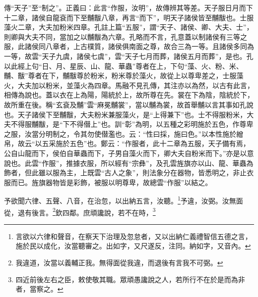 {\noindent\zhuan{}\fzbyks 傳“天子”至“制之”。正義曰：此言“作服，汝明”，故傳辨其等差。天子服日月而下十二章，諸侯自龍袞而下至黼黻八章，再言“而下”，明天子諸侯皆至黼黻也。士服藻火二章，大夫加粉米四章。孔註上篇“五服”，謂“天子、諸侯、卿、大夫、士”，則卿與大夫不同，當加之以黼黻為六章。孔略而不言，孔意蓋以制諸侯有三等之服，此諸侯同八章者，上古樸質，諸侯俱南面之尊，故合三為一等。且諸侯多同為一等，故雲“天子九虞，諸侯七虞”，雲“天子七月而葬，諸侯五月而葬”，是也。孔以此經上句“日、月、星辰、山、龍、華蟲”尊者在上，下句“藻、火、粉、米、黼、黻”尊者在下，黼黻尊於粉米，粉米尊於藻火，故從上以尊卑差之，士服藻火，大夫加以粉米，並藻火為四章。馬融不見孔傳，其注亦以為然，以古有此言，相傳為說也。蓋以衣在上為陽，陽統於上，故所尊在先。裳在下為陰，陰統於下，故所重在後。稱“玄袞及黼”雲“麻冕黼裳”，當以黼為裳，故首舉黼以言其事如孔說也。天子諸侯下至黼黻，大夫粉米兼服藻火，是“上得兼下”也。士不得服粉米，大夫不得服黼黻，是“下不得僣上”也。訓“彰”為明，以五種之彩明施於五色，作尊卑之服，汝當分明制之，令其勿使僣濫也。云：“性曰採，施曰色。”以本性施於繒帛，故云“以五采施於五色”也。鄭云：“作服者，此十二章為五服，天子備有焉，公自山龍而下，侯伯自華蟲而下，子男自藻火而下，卿大夫自粉米而下。”亦是以意說也。此雲“作服”，推據衣服，所以經有“宗彝”，及孔雲旌旗亦以山、龍、華蟲為飾者，但此雖以服為主，上既雲“古人之象”，則法象分在器物，皆悉明之，非止衣服而已。旌旗器物皆是彩飾，被服以明尊卑，故總雲“作服”以結之。 \par}

予欲聞六律、五聲、八音，在治忽，以出納五言，汝聽。\footnote{言欲以六律和聲音，在察天下治理及忽怠者，又以出納仁義禮智信五德之言，施於民以成化，汝當聽審之。出如字，又尺遂反，注同。納如字，又音內。}予違，汝弼。汝無面從，退有後言。\footnote{我違道，汝當以義輔正我。無得面從我違，而退後有言我不可弼。}欽四鄰。庶頑讒說，若不在時，\footnote{四近前後左右之臣，敕使敬其職。眾頑愚讒說之人，若所行不在於是而為非者，當察之。}


